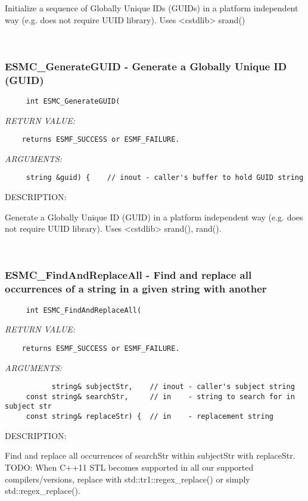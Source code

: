    Initialize a sequence of Globally Unique IDs (GUIDs) in a platform
   independent way (e.g. does not require UUID library).  Uses <cstdlib> srand() 
 
\mbox{}\hrulefill\
 
\subsubsection [ESMC\_GenerateGUID] {ESMC\_GenerateGUID - Generate a Globally Unique ID (GUID)}


  
\begin{verbatim}     int ESMC_GenerateGUID(\end{verbatim}{\em RETURN VALUE:}
\begin{verbatim}    returns ESMF_SUCCESS or ESMF_FAILURE.\end{verbatim}{\em ARGUMENTS:}
\begin{verbatim}     string &guid) {    // inout - caller's buffer to hold GUID string
 \end{verbatim}
{\sf DESCRIPTION:\\ }


   Generate a Globally Unique ID (GUID) in a platform independent way (e.g.
     does not require UUID library).  Uses <cstdlib> srand(), rand(). 
 
\mbox{}\hrulefill\
 
\subsubsection [ESMC\_FindAndReplaceAll] {ESMC\_FindAndReplaceAll - Find and replace all occurrences of a string in a given string with another}


  
\begin{verbatim}     int ESMC_FindAndReplaceAll(\end{verbatim}{\em RETURN VALUE:}
\begin{verbatim}    returns ESMF_SUCCESS or ESMF_FAILURE.\end{verbatim}{\em ARGUMENTS:}
\begin{verbatim}           string& subjectStr,    // inout - caller's subject string
     const string& searchStr,     // in    - string to search for in subject str
     const string& replaceStr) {  // in    - replacement string
 \end{verbatim}
{\sf DESCRIPTION:\\ }


   Find and replace all occurrences of searchStr within subjectStr with
   replaceStr.  TODO:  When C++11 STL becomes supported in all our supported
   compilers/versions, replace with std::tr1::regex_replace() or simply
   std::regex_replace().
\setlength{\parskip}{\oldparskip}
\setlength{\parindent}{\oldparindent}
\setlength{\baselineskip}{\oldbaselineskip}
